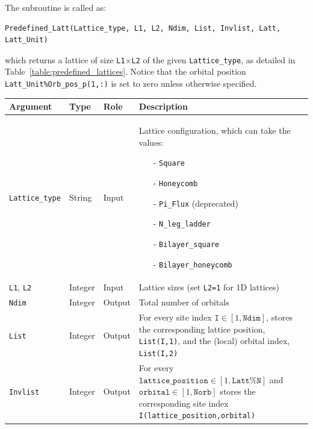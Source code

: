 The subroutine is called as:
\begin{lstlisting}[style=fortran]
Predefined_Latt(Lattice_type, L1, L2, Ndim, List, Invlist, Latt, Latt_Unit)
\end{lstlisting}
which returns a lattice of size \texttt{L1$\times$L2} of the given \texttt{Lattice\_type}, as detailed in Table~\ref{table:predefined_lattices}. Notice that the orbital position \texttt{Latt\_Unit\%Orb\_pos\_p(1,:)} is set to zero unless otherwise specified.
%
\begin{table}[h!]
	\begin{center}
	\begin{tabular}{@{} p{}  p{} p{} p{}  @{}}
		\toprule
		Argument                 & Type       & Role   & Description \\
		\midrule
		\texttt{Lattice\_type}   & String     & Input  & Lattice configuration, which can take the values:
		\vspace{-\topsep} %
		\begin{itemize}
			\setlength{\itemsep}{0pt} \setlength{\parskip}{0pt} \setlength{\parsep}{0pt}
			\item[-] \texttt{Square}
			\item[-] \texttt{Honeycomb}
			\item[-] \texttt{Pi\_Flux}  (deprecated)
			\item[-] \texttt{N\_leg\_ladder}
			\item[-] \texttt{Bilayer\_square}
			\item[-] \texttt{Bilayer\_honeycomb}
			\vspace{-1.4\topsep} 
		\end{itemize} \\
		\texttt{L1}, \texttt{L2} & Integer    & Input  & Lattice sizes (set \texttt{L2=1} for 1D lattices)\\
		\texttt{Ndim}            & Integer    & Output & Total number of orbitals\\
		\texttt{List}            & Integer    & Output & For every site index $\texttt{I} \in [1,\texttt{Ndim}]$, stores the corresponding lattice position, \texttt{List(I,1)}, and the (local) orbital index, \texttt{List(I,2)}\\
		\texttt{Invlist}         & Integer    & Output &  For every $\texttt{lattice\_position} \in [1,\texttt{Latt\%N}]$ and $\texttt{orbital} \in [1,\texttt{Norb}]$ stores the corresponding site index \texttt{I(lattice\_position,orbital)}\\

\end{tabular}
\end{center}
\end{table}
